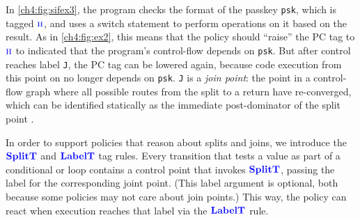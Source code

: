 In \cref{ch4:fig:sifex3}, the program checks the format of the passkey {\tt psk}, which is tagged
\(\textnormal{\color{blue} \sc h}\), and uses a switch statement to perform operations on it based on the result.
As in \cref{ch4:fig:ex2}, this means that the policy should ``raise'' the PC tag to \(\textnormal{\color{blue} \sc h}\) to
indicated that the program's control-flow depends on {\tt psk}.
But after control reaches label {\tt J}, the PC tag can be lowered again, because code execution from this
point on no longer depends on {\tt psk}.
{\tt J} is a {\em join point}: the point in a control-flow graph where all
possible routes from the split to a return have re-converged, which can be identified
statically as the immediate post-dominator of the split point \cite{Denning77:SecureInformationFlow}.

In order to support policies that reason about splits and joins, we introduce the \(\color{blue} \mathbf{SplitT}\) and
\(\color{blue} \mathbf{LabelT}\) tag rules. Every transition that tests a value as part of a conditional or loop
contains a control point that invokes \(\color{blue} \mathbf{SplitT}\), passing the label for the corresponding joint point.
(This label argument is optional, both because some policies may not care
about join points.) 
This way, the policy can react when execution reaches that label via the \(\color{blue} \mathbf{LabelT}\) rule.

